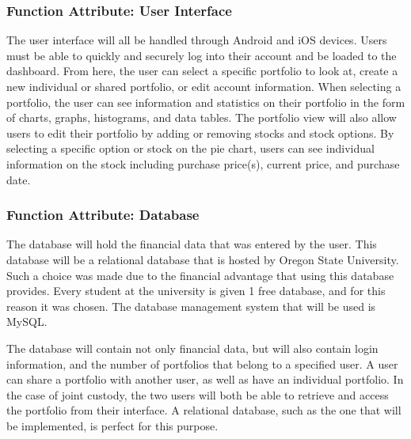 \documentclass[onecolumn, draftclsnofoot,10pt, compsoc]{IEEEtran}
\begin{document}
\subsubsection{Function Attribute: User Interface}
        The user interface will all be handled through Android and iOS devices. Users must be able to quickly and
        securely log into their account and be loaded to the dashboard. From here, the user can select a specific
        portfolio to look at, create a new individual or shared portfolio, or edit account information.
        When selecting a portfolio, the user can see information and statistics on their portfolio in the 
        form of charts, graphs, histograms, and data tables. The portfolio view will also allow users to edit their
        portfolio by adding or removing stocks and stock options. By selecting a specific option or stock on the
        pie chart, users can see individual information on the stock including purchase price(s), current price,
        and purchase date.
        
\subsubsection{Function Attribute: Database}
        The database will hold the financial data that was entered by the user. This database will be a relational database that is hosted by Oregon State University. Such a choice was
        made due to the financial advantage that using this database provides. Every student at the university is given 1 free database, and for this reason it was chosen. The database
        management system that will be used is MySQL.

        The database will contain not only financial data, but will also contain login information, and the number of portfolios that belong to a specified user. A user can share a portfolio
        with another user, as well as have an individual portfolio. In the case of joint custody, the two users will both be able to retrieve and access the portfolio from their interface.
        A relational database, such as the one that will be implemented, is perfect for this purpose.
\end{document}
